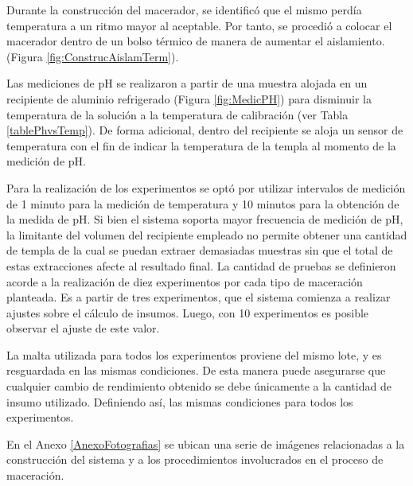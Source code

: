         \par Durante la construcción del macerador, se identificó que el mismo perdía temperatura a un ritmo mayor al aceptable. Por tanto, se procedió a colocar el macerador dentro de un bolso térmico de manera de aumentar el aislamiento. (Figura \ref{fig:ConstrucAislamTerm}).
        
        \par Las mediciones de pH se realizaron a partir de una muestra alojada en un recipiente de aluminio refrigerado (Figura \ref{fig:MedicPH}) para disminuir la temperatura de la solución a la temperatura de calibración (ver Tabla \ref{tablePhvsTemp}). De forma adicional, dentro del recipiente se aloja un sensor de temperatura con el fin de indicar la temperatura de la templa al momento de la medición de pH.
        
        \par Para la realización de los experimentos se optó por utilizar intervalos de medición de 1 minuto para la medición de temperatura y 10 minutos para la obtención de la medida de pH. Si bien el sistema soporta mayor frecuencia de medición de pH, la limitante del volumen del recipiente empleado no permite obtener una cantidad de templa de la cual se puedan extraer demasiadas muestras sin que el total de estas extracciones afecte al resultado final. La cantidad de pruebas se definieron acorde a la realización de diez experimentos por cada tipo de maceración planteada. Es a partir de tres experimentos, que el sistema comienza a realizar ajustes sobre el cálculo de insumos. Luego, con 10 experimentos es posible observar el ajuste de este valor.
        
        \par La malta utilizada para todos los experimentos proviene del mismo lote, y es resguardada en las mismas condiciones. De esta manera puede asegurarse que cualquier cambio de rendimiento obtenido se debe únicamente a la cantidad de insumo utilizado. Definiendo así, las mismas condiciones para todos los experimentos.
        
        En el Anexo \ref{AnexoFotografias} se ubican una serie de imágenes relacionadas a la construcción del sistema y a los procedimientos involucrados en el proceso de maceración.
    
